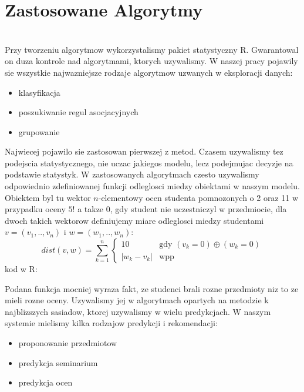 \documentclass[licencjacka]{pracamgr}
\begin{document}
\chapter{Zastosowane Algorytmy}
~\\ \indent Przy tworzeniu algorytmow wykorzystalismy pakiet statystyczny R. Gwarantowal on duza kontrole nad algorytmami,
ktorych uzywalismy. W naszej pracy pojawily sie wszystkie najwazniejsze rodzaje algorytmow uzwanych w eksploracji danych:
\begin{itemize}
 \item klasyfikacja
 \item poszukiwanie regul asocjacyjnych
 \item grupowanie
\end{itemize}
Najwiecej pojawilo sie zastosowan pierwszej z metod. Czasem uzywalismy tez podejscia statystycznego, nie uczac jakiegos modelu,
lecz podejmujac decyzje na podstawie statystyk. W zastosowanych algorytmach czesto uzywalismy odpowiednio zdefiniowanej
funkcji odleglosci miedzy obiektami w naszym modelu. Obiektem byl tu wektor $n$-elementowy ocen studenta pomnozonych o 2 oraz 11
w przypadku oceny $5!$ a takze $0$, gdy student nie uczestniczyl w przedmiocie, dla dwoch takich wektorow definiujemy miare 
odleglosci miedzy studentami $v=(v_{1},..,v_{n})$ i $w=(w_{1},..,w_{n})$:
\[
 dist(v,w) = \sum_{k=1}^n \begin{cases} 10 &\text{gdy } (v_{k} = 0)\oplus(w_{k} = 0) \\|w_{k}-v_{k}| &\text{wpp}  \end{cases}
\]
kod w R:

Podana funkcja mocniej wyraza fakt, ze studenci brali rozne przedmioty niz to ze mieli rozne oceny. Uzywalismy
jej w algorytmach opartych na metodzie k najblizszych sasiadow, ktorej uzywalismy w wielu predykcjach. W naszym systemie 
mielismy kilka rodzajow predykcji i rekomendacji:
\begin{itemize}
 \item proponowanie przedmiotow
 \item predykcja seminarium
 \item predykcja ocen
\end{itemize}
\end{document}
